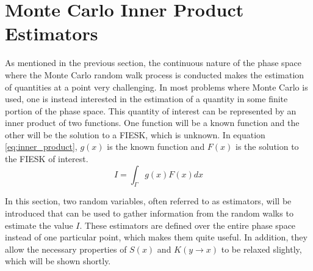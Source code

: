 \section{Monte Carlo Inner Product Estimators}
\label{sec:mc_int_eqn_estimators}
As mentioned in the previous section, the continuous nature of the phase space
where the Monte Carlo random walk process is conducted makes the estimation of
quantities at a point very challenging. In most problems where Monte Carlo is 
used, one is instead interested in the estimation of a quantity in some finite 
portion of the phase space. This quantity of interest can be represented by
an inner product of two functions. One function will be a known function and
the other will be the solution to a FIESK, which is unknown. In equation 
\ref{eq:inner_product}, $g(x)$ is the known function and $F(x)$ is the solution 
to the FIESK of interest.
\begin{equation}
  I = \int_{\Gamma} g(x)F(x)dx
  \label{eq:inner_product}
\end{equation}

In this section, two random variables, often referred to as estimators, will 
be introduced that can be used to gather information from the random walks to 
estimate the value $I$. These estimators are defined over the entire phase 
space instead of one particular point, which makes them quite useful. In 
addition, they allow the necessary properties of $S(x)$ and $K(y \to x)$ to be 
relaxed slightly, which will be shown shortly.

